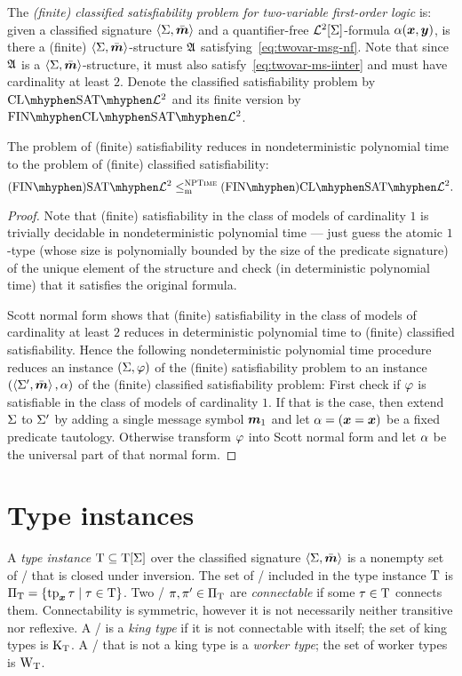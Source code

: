 \begin{definition}\label{def:clsig-twovar}
The \emph{(finite) classified satisfiability problem for two-variable
first-order logic} is:
given a classified signature $\left\langle \mathrm{\Sigma},\bar{\bm{m}} \right\rangle$ and a quantifier-free
$\mathcal{L}^{2}[\mathrm{\Sigma}]$-formula $\alpha(\bm{x},\bm{y})$, is there a (finite)
$\left\langle \mathrm{\Sigma},\bar{\bm{m}} \right\rangle$-structure $\mathfrak{A}$ satisfying~\cref{eq:twovar-msg-nf}.
Note that since $\mathfrak{A}$ is a $\left\langle \mathrm{\Sigma},\bar{\bm{m}} \right\rangle$-structure, it must also
satisfy~\cref{eq:twovar-ms-iinter} and must have cardinality at least $2$.
Denote the classified satisfiability problem by $\ClSat{\vFo2}$ and its finite
version by $\FinClSat{\vFo2}$.
\end{definition}

\begin{remark}
The problem of (finite) satisfiability reduces in nondeterministic polynomial
time to the problem of (finite) classified satisfiability:
\[
  \FinASat{\vFo2} \red\cNP \FinAClSat{\vFo2}.
\]
\end{remark}
\begin{proof}

Note that (finite) satisfiability in the class of models of cardinality $1$ is
trivially decidable in nondeterministic polynomial time --- just guess the
atomic $1$-type (whose size is polynomially bounded by the size of the
predicate signature) of the unique element of the structure and check (in
deterministic polynomial time) that it satisfies the original formula.

Scott normal form shows that (finite) satisfiability in the class of models of
cardinality at least $2$ reduces in deterministic polynomial time to (finite)
classified satisfiability.
Hence the following nondeterministic polynomial time procedure reduces an
instance $(\mathrm{\Sigma}, \varphi)$ of the (finite) satisfiability problem to an instance
$(\left\langle \mathrm{\Sigma'},\bar{\bm{m}} \right\rangle, \alpha)$ of the (finite) classified satisfiability problem:
First check if $\varphi$ is satisfiable in the class of models of cardinality $1$.
If that is the case, then extend $\mathrm{\Sigma}$ to $\mathrm{\Sigma'}$ by adding a single message
symbol $\bm{m}_{1}$ and let $\alpha = (\bm{x} = \bm{x})$ be a fixed predicate tautology.
Otherwise transform $\varphi$ into Scott normal form and let $\alpha$ be the
universal part of that normal form.
\end{proof}

\section{Type instances}
A \emph{type instance} $\mathrm{T} \subseteq \mathrm{T}[\mathrm{\Sigma}]$ over the classified signature
$\left\langle \mathrm{\Sigma},\bar{\bm{m}} \right\rangle$ is a nonempty set of \twotypes/ that is closed under
inversion.
The set of \onetypes/ included in the type instance $\mathrm{T}$ is
$\Pi_{\mathrm{T}} = \left\{\operatorname{tp}_{\bm{x}}\tau\mathrel{}\middle|\mathrel{}\tau\in\mathrm{T}\right\}$.
Two \onetypes/ $\pi,{\pi'} \in \Pi_{\mathrm{T}}$ are \emph{connectable} if some
$\tau\in\mathrm{T}$ connects them.
Connectability is symmetric, however it is not necessarily neither transitive
nor reflexive.
A \onetype/ is a \emph{king type} if it is not connectable with itself;
the set of king types is $\mathrm{K}_{\mathrm{T}}$.
A \onetype/ that is not a king type is a \emph{worker type};
the set of worker types is $\mathrm{W}_{\mathrm{T}}$.

